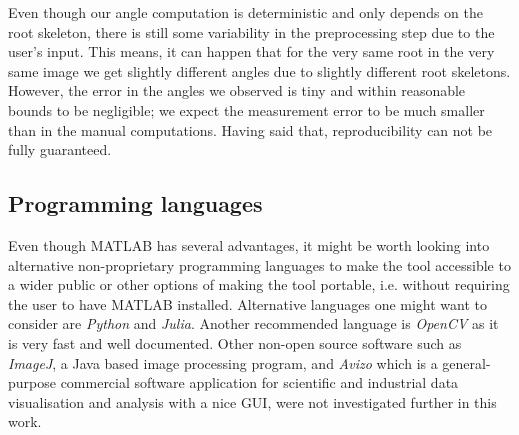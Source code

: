 Even though our angle computation is deterministic %
and only depends on the root skeleton, there is still some variability in the preprocessing step due to the user's input. This means, it can happen that for the very same root in the very same image we get slightly different angles due to slightly different root skeletons. %
However, the error in the angles we observed is tiny and within reasonable bounds to be negligible; we expect the measurement error to be much smaller than in the manual computations. Having said that, reproducibility can not be fully guaranteed. %


%
%







\subsection{Programming languages}

Even though MATLAB has several advantages, it might be worth looking into alternative non-proprietary programming languages to make the tool accessible to a wider public or other options of making the tool portable, i.e. without requiring the user to have MATLAB installed.
Alternative languages one might want to consider are \textit{Python} and \textit{Julia}. Another recommended language is \textit{OpenCV} as it is very fast and well documented. Other non-open source software such as \textit{ImageJ}, a Java based image processing program, and \textit{Avizo} which is a general-purpose commercial software application for scientific and industrial data visualisation and analysis with a nice GUI, were not investigated further in this work. 

